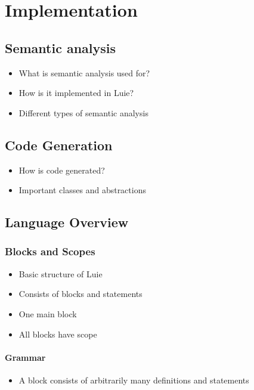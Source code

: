 \chapter{Implementation}
\label{ch:implementation}

\section{Semantic analysis}
\begin{itemize}
    \item What is semantic analysis used for?
    \item How is it implemented in Luie?
    \item Different types of semantic analysis
\end{itemize}

\section{Code Generation}
\begin{itemize}
    \item How is code generated?
    \item Important classes and abstractions
\end{itemize}

\section{Language Overview}

\subsection{Blocks and Scopes}
\begin{itemize}
    \item Basic structure of Luie
    \item Consists of blocks and statements
    \item One main block
    \item All blocks have scope 
\end{itemize}
\subsubsection{Grammar}
\begin{itemize}
    \item A block consists of arbitrarily many definitions and statements
\end{itemize}

